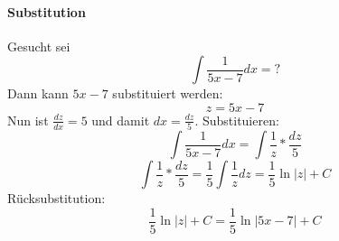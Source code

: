\documentclass[12pt,landscape]{article}
\begin{document}
\begin{multicols}{3}
\begin{itemize}
\paragraph{Substitution} Gesucht sei 
\[
 \int \frac{1}{5x - 7} dx = ?
\]
Dann kann $5x - 7$ substituiert werden:
\[
	z = 5x - 7
\]
Nun ist $\frac{dz}{dx} = 5$ und damit $dx = \frac{dz}{5}$. Substituieren:
\[
 \int \frac{1}{5x - 7} dx = \int \frac{1}{z} * \frac{dz}{5}
\]
\[
	\int \frac{1}{z} * \frac{dz}{5} = \frac{1}{5} \int \frac{1}{z} dz = \frac{1}{5} \ln |z| + C
\]
Rücksubstitution:
\[
	\frac{1}{5} \ln |z| + C = 	\frac{1}{5} \ln |5x - 7| + C
\]
\end{itemize}
\end{multicols}
\end{document}
